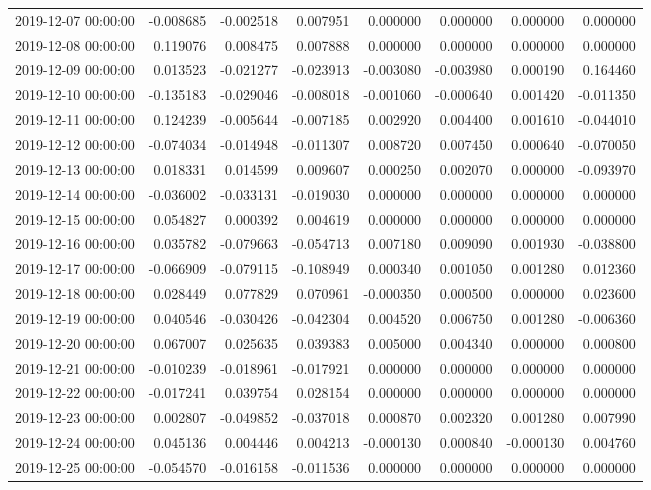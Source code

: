 \begin{tabular}{lrrrrrrr}
2019-12-07 00:00:00 & -0.008685 & -0.002518 & 0.007951 & 0.000000 & 0.000000 & 0.000000 & 0.000000 \\
2019-12-08 00:00:00 & 0.119076 & 0.008475 & 0.007888 & 0.000000 & 0.000000 & 0.000000 & 0.000000 \\
2019-12-09 00:00:00 & 0.013523 & -0.021277 & -0.023913 & -0.003080 & -0.003980 & 0.000190 & 0.164460 \\
2019-12-10 00:00:00 & -0.135183 & -0.029046 & -0.008018 & -0.001060 & -0.000640 & 0.001420 & -0.011350 \\
2019-12-11 00:00:00 & 0.124239 & -0.005644 & -0.007185 & 0.002920 & 0.004400 & 0.001610 & -0.044010 \\
2019-12-12 00:00:00 & -0.074034 & -0.014948 & -0.011307 & 0.008720 & 0.007450 & 0.000640 & -0.070050 \\
2019-12-13 00:00:00 & 0.018331 & 0.014599 & 0.009607 & 0.000250 & 0.002070 & 0.000000 & -0.093970 \\
2019-12-14 00:00:00 & -0.036002 & -0.033131 & -0.019030 & 0.000000 & 0.000000 & 0.000000 & 0.000000 \\
2019-12-15 00:00:00 & 0.054827 & 0.000392 & 0.004619 & 0.000000 & 0.000000 & 0.000000 & 0.000000 \\
2019-12-16 00:00:00 & 0.035782 & -0.079663 & -0.054713 & 0.007180 & 0.009090 & 0.001930 & -0.038800 \\
2019-12-17 00:00:00 & -0.066909 & -0.079115 & -0.108949 & 0.000340 & 0.001050 & 0.001280 & 0.012360 \\
2019-12-18 00:00:00 & 0.028449 & 0.077829 & 0.070961 & -0.000350 & 0.000500 & 0.000000 & 0.023600 \\
2019-12-19 00:00:00 & 0.040546 & -0.030426 & -0.042304 & 0.004520 & 0.006750 & 0.001280 & -0.006360 \\
2019-12-20 00:00:00 & 0.067007 & 0.025635 & 0.039383 & 0.005000 & 0.004340 & 0.000000 & 0.000800 \\
2019-12-21 00:00:00 & -0.010239 & -0.018961 & -0.017921 & 0.000000 & 0.000000 & 0.000000 & 0.000000 \\
2019-12-22 00:00:00 & -0.017241 & 0.039754 & 0.028154 & 0.000000 & 0.000000 & 0.000000 & 0.000000 \\
2019-12-23 00:00:00 & 0.002807 & -0.049852 & -0.037018 & 0.000870 & 0.002320 & 0.001280 & 0.007990 \\
2019-12-24 00:00:00 & 0.045136 & 0.004446 & 0.004213 & -0.000130 & 0.000840 & -0.000130 & 0.004760 \\
2019-12-25 00:00:00 & -0.054570 & -0.016158 & -0.011536 & 0.000000 & 0.000000 & 0.000000 & 0.000000 \\

\end{tabular}
